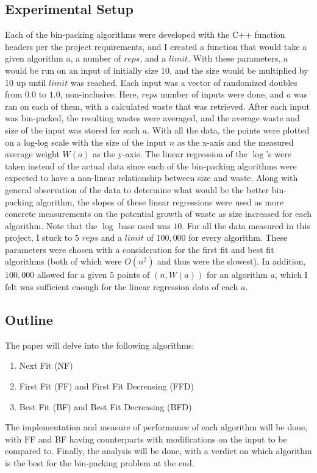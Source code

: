 \documentclass{article}
\begin{document}
\subsection{Experimental Setup}
    Each of the bin-packing algorithms were developed with the C++ function
    headers per the project requirements, and I created a function that would
    take a given algorithm $a$, a number of $reps$, and a $limit$. With these
    parameters, $a$ would be run on an input of initially size $10$, and the 
    size would be multiplied by 10 up until $limit$ was reached. Each input was 
    a vector of randomized doubles from $0.0$ to $1.0$, non-inclusive. 
    \nextblurb
    Here, $reps$ number of inputs were done, and $a$ was ran on each of them, 
    with a calculated waste that was retrieved. After each input was bin-packed, 
    the resulting wastes were averaged, and the average waste and size of the
    input was stored for each $a$.
    \nextblurb
    With all the data, the points were plotted on a log-log scale with 
    the size of the input $n$ as the x-axis and the measured average weight
    $W(a)$ as the y-axis. The linear regression of the $\log$'s were taken 
    instead of the actual data since each of the bin-packing algorithms were
    expected to have a non-linear relationship between size and waste. Along 
    with general observation of the data to determine what would be the better 
    bin-packing algorithm, the slopes of these linear regressions were used as
    more concrete measurements on the potential growth of waste as size
    increased for each algorithm. Note that the $\log$ base used was $10$.
    \nextblurb
    For all the data measured in this project, I stuck to $5$ $reps$ and a 
    $limit$ of $100,000$ for every algorithm. These parameters were chosen with
    a consideration for the first fit and best fit algorithms (both of which
    were $O(n^2)$ and thus were the slowest). In addition, $100,000$ allowed for
    a given $5$ points of $(n, W(a))$ for an algorithm $a$, which I felt was
    sufficient enough for the linear regression data of each $a$.
\subsection{Outline}
    The paper will delve into the following algorithms:
    \begin{enumerate}
        \item Next Fit (NF)
        \item First Fit (FF) and First Fit Decreasing (FFD)
        \item Best Fit (BF) and Best Fit Decreasing (BFD)
    \end{enumerate}
    \noindent The implementation and measure of performance of each algorithm 
    will be done, with FF and BF having counterparts with modifications on the 
    input to be compared to. Finally, the analysis will be done, with a verdict
    on which algorithm is the best for the bin-packing problem at the end.
\end{document}
